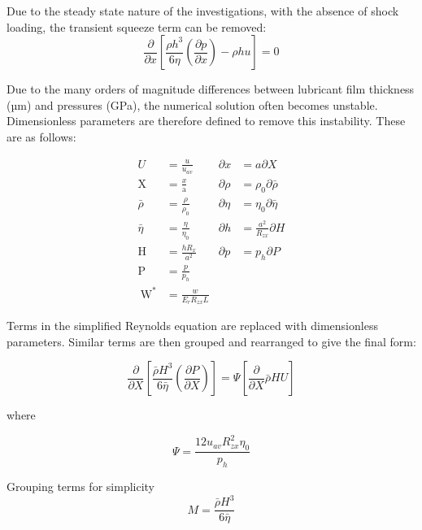 Due to the steady state nature of the investigations, with the absence of shock loading, the transient squeeze term can be removed:
\begin{equation}\label{eq3.2}
	\frac{\partial}{\partial x}\left[\frac{\rho h^{3}}{6 \eta}\left(\frac{\partial p}{\partial x}\right)-\rho h u\right]=0
\end{equation}

Due to the many orders of magnitude differences between lubricant film thickness (µm) and pressures (GPa), the numerical solution often becomes unstable. Dimensionless parameters are therefore defined to remove this instability. These are as follows:

\begin{equation}\label{eq3.3}
	\begin{aligned}
		U &=\frac{u}{u_{a v}} & \partial x &=a \partial X \\
		\mathrm{X} &=\frac{x}{\mathrm{a}} & \partial \rho &=\rho_{0} \partial \bar{\rho} \\
		\bar{\rho} &=\frac{\rho}{\rho_{0}} & \partial \eta &=\eta_{0} \partial \bar{\eta} \\
		\bar{\eta} &=\frac{\eta}{\eta_{0}} & \partial h &=\frac{a^{2}}{R_{z x}} \partial H \\
		\mathrm{H} &=\frac{h R_{x}}{a^{2}} & \partial p &=p_{h} \partial P \\
		\mathrm{P} &=\frac{p}{p_{h}} & \\
		\mathrm{~W}^{*} &=\frac{w}{E_{r} R_{z x} L} &
	\end{aligned}
\end{equation}

Terms in the simplified Reynolds equation are replaced with dimensionless parameters. Similar terms are then grouped and rearranged to give the final form:

\begin{equation}\label{eq3.4}
	\frac{\partial}{\partial X}\left[\frac{\bar{\rho} H^{3}}{6 \bar{\eta}}\left(\frac{\partial P}{\partial X}\right)\right]=\Psi\left[\frac{\partial}{\partial X} \bar{\rho} H U\right]
\end{equation}

where

\begin{equation}\label{eq3.5}
	\Psi=\frac{12 u_{a v} R_{z x}^{2} \eta_{0}}{p_{h}}
\end{equation}

Grouping terms for simplicity
\begin{equation}\label{eq3.6}
	M=\frac{\bar{\rho} H^{3}}{6 \bar{\eta}}
\end{equation}

